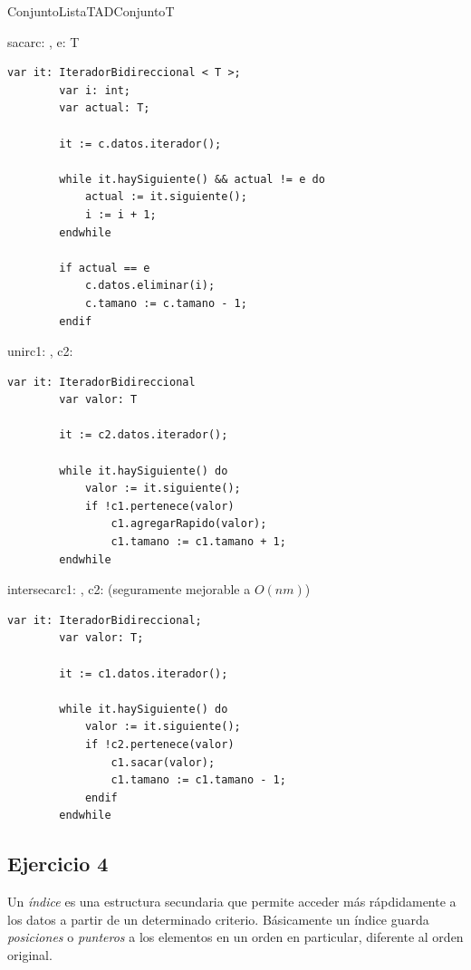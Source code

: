 \begin{module}{ConjuntoLista}{TAD}{Conjunto}{T}
	\pagebreak

	\begin{proc}{sacar}{\Inout c: \moduletype, \In e: T}{}
		\begin{lstlisting}[numbers=none,frame=none]
		var it: IteradorBidireccional < T >;
		var i: int;
		var actual: T;

		it := c.datos.iterador();
		
		while it.haySiguiente() && actual != e do
			actual := it.siguiente();
			i := i + 1;
		endwhile

		if actual == e
			c.datos.eliminar(i);
			c.tamano := c.tamano - 1;
		endif
		\end{lstlisting}
	\end{proc}

	\begin{proc}{unir}{\Inout c1: \moduletype, \In c2: \moduletype}{}
		\begin{lstlisting}[numbers=none,frame=none]
		var it: IteradorBidireccional
		var valor: T

		it := c2.datos.iterador();

		while it.haySiguiente() do
			valor := it.siguiente();
			if !c1.pertenece(valor)
				c1.agregarRapido(valor);
				c1.tamano := c1.tamano + 1;
		endwhile
		\end{lstlisting}
	\end{proc}

	\begin{proc}{intersecar}{\Inout c1: \moduletype, \In c2: \moduletype}{}
		 (seguramente mejorable a $O(nm)$)
		\begin{lstlisting}[numbers=none,frame=none]
		var it: IteradorBidireccional;
		var valor: T;

		it := c1.datos.iterador();

		while it.haySiguiente() do
			valor := it.siguiente();
			if !c2.pertenece(valor)
				c1.sacar(valor);
				c1.tamano := c1.tamano - 1;
			endif
		endwhile
		\end{lstlisting}
	\end{proc}

\end{module}

\subsection{Ejercicio 4}
Un \textit{índice} es una estructura secundaria que permite acceder más rápdidamente a los datos a partir de un determinado criterio. Básicamente un índice guarda \textit{posiciones} o \textit{punteros} a los elementos en un orden en particular, diferente al orden original.


